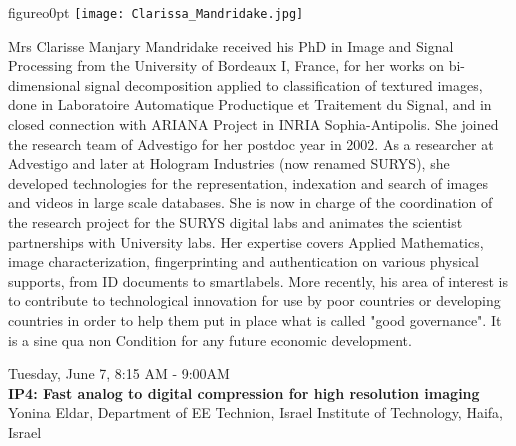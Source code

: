 \begin{wrapfloat}{figure}{o}{0pt}
\texttt{[image: Clarissa\_Mandridake.jpg]}
\end{wrapfloat}
Mrs Clarisse Manjary Mandridake received his PhD in Image and Signal Processing from the University of Bordeaux I, France, for her works on bi-dimensional signal decomposition applied to classification of textured images, done in Laboratoire Automatique Productique et Traitement du Signal, and in closed connection with ARIANA Project in INRIA Sophia-Antipolis. She joined the research team of Advestigo for her postdoc year in 2002. As a researcher at Advestigo and later at Hologram Industries (now renamed SURYS), she developed technologies for the representation, indexation and search of images and videos in large scale databases. She is now in charge of the coordination of the research project for the SURYS digital labs and animates the scientist partnerships with University labs. Her expertise covers Applied Mathematics, image characterization, fingerprinting and authentication on various physical supports, from ID documents to smartlabels. More recently, his area of interest is to contribute to technological innovation for use by poor countries or developing countries in order to help them put in place what is called "good governance". It is a sine qua non Condition for any future economic development.

\newpage\vspace{2cm}
\begin{center}{\Large{
Tuesday, June 7, 8:15 AM - 9:00AM \\
\textbf{IP4: Fast analog to digital compression for high resolution imaging}\\
Yonina Eldar, Department of EE Technion, Israel Institute of Technology, Haifa, Israel
}}\end{center}
\vspace{1cm}


